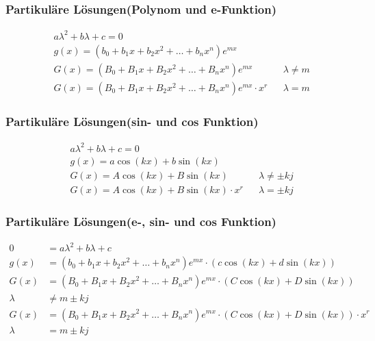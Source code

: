 \subsubsection*{Partikuläre Lösungen(Polynom und e-Funktion)}
\begin{align*}
&a\lambda^2+b\lambda+c=0\\
&g(x)=\left(b_0+b_1x+b_2x^2+\dots+b_nx^n\right)e^{mx}\\
&G(x)=\left(B_0+B_1x+B_2x^2+\dots+B_nx^n\right)e^{mx}&&\text{$\lambda\neq m$}\\
&G(x)=\left(B_0+B_1x+B_2x^2+\dots+B_nx^n\right)e^{mx}\cdot x^r&&\text{$\lambda = m$}
\end{align*}

\subsubsection*{Partikuläre Lösungen(sin- und cos Funktion)}
\begin{align*}
&a\lambda^2+b\lambda+c=0\\
&g(x)=a\cos\left(kx\right)+b\sin\left(kx\right)\\
&G(x)=A\cos\left(kx\right)+B\sin\left(kx\right)&&\text{$\lambda\neq \pm kj$}\\
&G(x)=A\cos\left(kx\right)+B\sin\left(kx\right)\cdot x^r&&\text{$\lambda = \pm kj$}
\end{align*}

\subsubsection*{Partikuläre Lösungen(e-, sin- und cos Funktion)}
\begin{align*}
0&=a\lambda^2+b\lambda+c\\
g(x)&=\left(b_0+b_1x+b_2x^2+\dots+b_nx^n\right)e^{mx}\cdot\left(c\cos\left(kx\right)+d\sin\left(kx\right)\right)\\
G(x)&=\left(B_0+B_1x+B_2x^2+\dots+B_nx^n\right)e^{mx}\cdot\left(C\cos\left(kx\right)+D\sin\left(kx\right)\right)\\
\lambda&\neq m \pm kj\\
G(x)&=\left(B_0+B_1x+B_2x^2+\dots+B_nx^n\right)e^{mx}\cdot\left(C\cos\left(kx\right)+D\sin\left(kx\right)\right)\cdot x^r\\
\lambda&= m \pm kj
\end{align*}